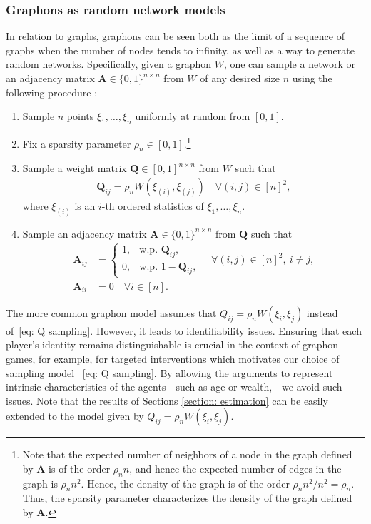 \documentclass[11pt]{article}
\newcommand{\bA}{\bm{A}}
\newcommand{\bQ}{\bm{Q}}
\newcommand{\<}{\langle}
\renewcommand{\>}{\rangle}
\theoremstyle{plain}
\theoremstyle{definition}
\theoremstyle{remark}
\begin{document}
\subsubsection*{Graphons as random network models}

In relation to graphs, graphons can be seen both as the limit of a sequence of graphs when the number of nodes tends to infinity, as well as a way to generate random networks. Specifically, given a graphon $W$, one can sample a network or an adjacency matrix $\bA \in \{0,1\}^{n \times n}$ from $W$  of any desired size $n$ using the following procedure \citep{lovasz}:
\begin{enumerate}
\item Sample $n$ points  $\xi_1, \dots, \xi_n$  uniformly at random from $[0,1]$. 
\item Fix a sparsity parameter $\rho_n \in [0,1]$.\footnote{Note that the expected number of neighbors of a node in the graph defined by $\bA$ is of the order $\rho_n n$, and hence the expected number of edges in the graph is $\rho_n n^2$. Hence, the density of the graph is of the order $\rho_n n^2/n^2 = \rho_n$. Thus, the sparsity parameter characterizes the density of the graph defined by $\bA$.}
\item Sample a weight matrix $\bQ \in [0,1]^{n \times n}$ from   $W$ such that
\begin{align}
\label{eq: Q sampling}
    \bQ_{ij} = \rho_n W(\xi_{(i)},\xi_{(j)}) \quad \forall (i,j) \in [n]^2, 
\end{align}
where $\xi_{(i)}$ is an $i$-th ordered statistics of $\xi_1, \ldots, \xi_n$.
\item Sample an adjacency matrix $\bA \in \{0,1\}^{n \times n}$ from $\bQ$ such that
\begin{equation}
\label{eq: A sampling}
\begin{aligned}
    \bA_{ij} &= \begin{cases}
        1, & \textrm{w.p. } \bQ_{ij}, \\
        0, & \textrm{w.p. } 1 - \bQ_{ij},
    \end{cases} \quad \forall (i,j) \in [n]^2, \ i \neq j, \\
    \bm{A}_{ii} &= 0 \quad \forall i \in [n]. 
\end{aligned}
\end{equation}
\end{enumerate}



The more common graphon model assumes that $Q_{ij} = \rho_n W(\xi_i, \xi_j)$ instead of~\eqref{eq: Q sampling}. However, it leads to identifiability issues. Ensuring that each player's identity remains distinguishable is crucial in the context of graphon games, for example, for targeted interventions which motivates our choice of sampling model ~\eqref{eq: Q sampling}.
 By allowing the arguments to represent intrinsic characteristics of the agents - such as age or wealth, - we avoid such issues. Note that the results of Sections \ref{section: estimation} can be easily extended to the model given by $Q_{ij} = \rho_n W(\xi_i, \xi_j)$.
\end{document}
